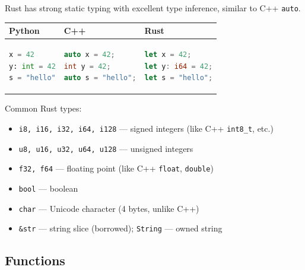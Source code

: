 \documentclass[11pt,a4paper]{article}
\begin{document}
Rust has strong static typing with excellent type inference, similar to C++ \texttt{auto}.

\begin{center}
\begin{tabular}{p{4cm}p{4cm}p{4cm}}
\toprule
\textbf{Python} & \textbf{C++} & \textbf{Rust} \\
\midrule
\begin{lstlisting}[language=Python,frame=none,numbers=none]
x = 42
y: int = 42
s = "hello"
\end{lstlisting}
&
\begin{lstlisting}[language=C++,frame=none,numbers=none]
auto x = 42;
int y = 42;
auto s = "hello";
\end{lstlisting}
&
\begin{lstlisting}[language=Rust,frame=none,numbers=none]
let x = 42;
let y: i64 = 42;
let s = "hello";
\end{lstlisting}
\\
\bottomrule
\end{tabular}
\end{center}

Common Rust types:
\begin{itemize}
    \item \texttt{i8, i16, i32, i64, i128} — signed integers (like C++ \texttt{int8\_t}, etc.)
    \item \texttt{u8, u16, u32, u64, u128} — unsigned integers
    \item \texttt{f32, f64} — floating point (like C++ \texttt{float}, \texttt{double})
    \item \texttt{bool} — boolean
    \item \texttt{char} — Unicode character (4 bytes, unlike C++)
    \item \texttt{\&str} — string slice (borrowed); \texttt{String} — owned string
\end{itemize}

\subsection{Functions}
\end{document}

